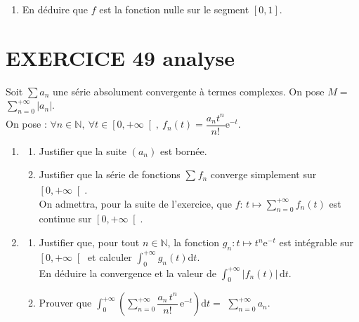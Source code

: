 \documentclass[10pt,oneside]{article}
\begin{document}
\begin{flushleft}
\begin{enumerate}
\begin{enumerate}
\item  Calculer $\displaystyle\int
_{0}^{1}P_{n}\left( t\right) f\left( t\right) \mathrm{d}t$.
\end{enumerate}
\item  
En d\'{e}duire que $f$ est la fonction nulle sur le segment $\left[ 0,1
\right] .$

\end{enumerate}

\section*{EXERCICE 49 \:analyse }

Soit $\displaystyle\sum a_{n}$ une s\'{e}rie absolument convergente \`{a} termes
complexes. On pose $M=$ $\displaystyle\sum\limits_{n=0}^{+\infty }\left\vert
a_{n}\right\vert .$\\
 On pose : $ \forall n\in \mathbb{N},\: \forall t\in \left[
0,+\infty \right[,\: f_{n}\left( t\right) =\dfrac{a_{n}t^{n}}{n!}
\mathrm{e}^{-t}.$\\
\begin{enumerate}

\item  
\begin{enumerate}
\item
Justifier que la suite $(a_n)$ est bornée.
\item
Justifier que la série de fonctions   $\sum\limits_{}^{ }f_{n}$ converge simplement sur $\left[ 0,+\infty \right[$.\\
\medskip
On admettra, pour la suite de l'exercice, que  $f$: $t\mapsto \displaystyle\sum\limits_{n=0}^{+\infty }f_{n}(t)$ est continue sur $\left[ 0,+\infty \right[ .$
\end{enumerate}
\item
\begin{enumerate}
\item
Justifier que, pour tout $n\in{\mathbb{N}}$, la fonction $g_n:t\mapsto t^n\text{e}^{-t}$ est intégrable sur $\left[ 0,+\infty \right[$ et calculer $\displaystyle\int_{0}^{+\infty }g_n(t)  \mathrm{d}t$.\\
En déduire la convergence et la valeur de $\displaystyle\int_{0}^{+\infty }\left\vert
f_{n}\left( t\right) \right\vert \, \mathrm{d}t$.

\item Prouver que $\displaystyle\int_{0}^{+\infty }\left(
\displaystyle\sum\limits_{n=0}^{+\infty }\dfrac{a_{n}\,t^{n}}{n!}\,\mathrm{e}^{-t}\right) \mathrm{d}t=$ $
\displaystyle\sum\limits_{n=0}^{+\infty }a_{n}.$ 
\end{enumerate}
\end{enumerate}



\end{flushleft}
\end{document}
